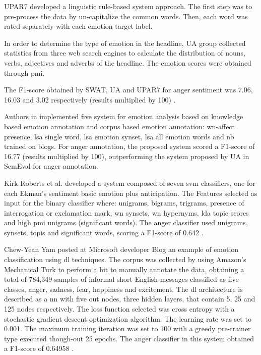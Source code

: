 UPAR7 developed a linguistic rule-based system approach. The first step was to pre-process the data by un-capitalize the common words. Then, each word was rated separately with each emotion target label. 

In order to determine the type of emotion in the headline, UA group collected statistics from three web search engines to calculate the distribution of nouns, verbs, adjectives and adverbs of the headline. The emotion scores were obtained through \acrfull{pmi}.

The F1-score obtained by SWAT, UA and UPAR7 for anger sentiment was 7.06, 16.03 and 3.02 respectively (results multiplied by 100) \cite{strapparava2007semeval}.

Authors in \cite{strapparava2008learning} implemented five system for emotion analysis based on knowledge based emotion annotation and corpus based emotion annotation: \acrshort{wn}-affect presence, \acrshort{lsa} single word, \acrshort{lsa} emotion synset, \acrshort{lsa} all emotion words and \acrshort{nb} trained on blogs. For anger annotation, the proposed system scored a F1-score of 16.77 (results multiplied by 100), outperforming the system proposed by UA in SemEval for anger annotation.

Kirk Roberts et al. developed a system composed of seven \acrshort{svm} classifiers, one for each Ekman's sentiment basic emotion plus anticipation. The Features selected as input for the binary classifier where: unigrams, bigrams, trigrams, presence of interrogation or exclamation mark, \acrlong{wn} synsets, \acrshort{wn} hypernyms, \acrlong{lda} topic scores and high \acrshort{pmi} unigrams (significant words). The anger classifier used unigrams, synsets, topis and significant words, scoring a F1-score of 0.642 \cite{roberts2012empatweet}.

Chew-Yean Yam posted at Microsoft developer Blog an example of emotion classification using \acrfull{dl} techniques. The corpus was collected by using Amazon's Mechanical Turk to perform a \acrfull{hit} to manually annotate the data, obtaining a total of 784,349 samples of informal short English messages classified as five classes, anger, sadness, fear, happiness and excitement. The \acrshort{dl} architecture is described as a \acrfull{nn} with five out nodes, three hidden layers, that contain 5, 25 and 125 nodes respectively. The loss function selected was cross entropy with a stochastic gradient descent optimization algorithm. The learning rate was set to 0.001. The maximum training iteration was set to 100 with a greedy pre-trainer type executed though-out 25 epochs. The anger classifier in this system obtained a F1-score of 0.64958 \cite{microsoftEmotionAPI}.

